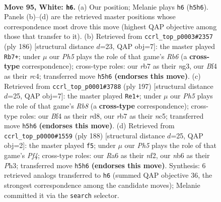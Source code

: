 \documentclass[11pt]{article}
\begin{document}
\clearpage

\begin{figure}[p]\centering
\begin{subfigure}{0.46\textwidth}\centering
\resizebox{\linewidth}{!}{%
\newchessgame
\chessboard[
  setfen={7k/1r6/Rn3P2/7P/p4B2/P7/7K/8 w - - 7 95},
  showmover=false,
  pgfstyle=straightmove, color=movearrow, markmove={h5-h6}
]}
\caption{}
\end{subfigure}\hfill
\begin{subfigure}{0.46\textwidth}\centering
\resizebox{\linewidth}{!}{%
\newchessgame
\chessboard[
  setfen={8/3k4/1R2p1B1/7p/2r2P1P/6n1/P2K4/8 w - - 5 94},
  showmover=false,
  pgfstyle=straightmove, color=movearrow, markmove={b6-b7}
]}
\caption{}
\end{subfigure}
\\[4pt]
\begin{subfigure}{0.46\textwidth}\centering
\resizebox{\linewidth}{!}{%
\newchessgame
\chessboard[
  setfen={3R4/1P5k/8/2N4p/4K1pP/6b1/8/1r6 b - - 16 99},
  showmover=false,
  pgfstyle=straightmove, color=movearrow, markmove={b1-e1}
]}
\caption{}
\end{subfigure}\hfill
\begin{subfigure}{0.46\textwidth}\centering
\resizebox{\linewidth}{!}{%
\newchessgame
\chessboard[
  setfen={8/8/2k1K3/R6p/1B3P1P/3b3P/5n2/8 w - - 3 95},
  showmover=false,
  pgfstyle=straightmove, color=movearrow, markmove={f4-f5}
]}
\caption{}
\end{subfigure}
\caption{\textbf{Move 95, White: \texttt{h6}.} (a) Our position; Melanie plays \texttt{h6} (\texttt{h5h6}). Panels (b)--(d) are the retrieved master positions whose correspondence most drove this move (highest QAP objective among those that transfer to it). (b) Retrieved from \texttt{ccrl\_top\_p0003\#2357} (ply 186) [structural distance $d$=23, QAP obj=7]: the master played \texttt{Rb7+}; under $\mu$ our \emph{Ph5} plays the role of that game's \emph{Rb6} (a \textbf{cross-type} correspondence); cross-type roles: our \emph{r}b7 as their \emph{n}g3, our \emph{B}f4 as their \emph{r}c4; transferred move \texttt{h5h6} \textbf{(endorses this move)}. (c) Retrieved from \texttt{ccrl\_top\_p0001\#3788} (ply 197) [structural distance $d$=25, QAP obj=7]: the master played \texttt{Re1+}; under $\mu$ our \emph{Ph5} plays the role of that game's \emph{Rb8} (a \textbf{cross-type} correspondence); cross-type roles: our \emph{B}f4 as their \emph{r}d8, our \emph{r}b7 as their \emph{n}c5; transferred move \texttt{h5h6} \textbf{(endorses this move)}. (d) Retrieved from \texttt{ccrl\_top\_p0000\#1559} (ply 188) [structural distance $d$=25, QAP obj=2]: the master played \texttt{f5}; under $\mu$ our \emph{Ph5} plays the role of that game's \emph{Pf4}; cross-type roles: our \emph{R}a6 as their \emph{n}f2, our \emph{n}b6 as their \emph{P}h3; transferred move \texttt{h5h6} \textbf{(endorses this move)}. Synthesis: 6 retrieved analogs transferred to \texttt{h6} (summed QAP objective 36, the strongest correspondence among the candidate moves); Melanie committed it via the \texttt{search} selector.}
\label{fig:thought-m188}
\end{figure}
\end{document}
